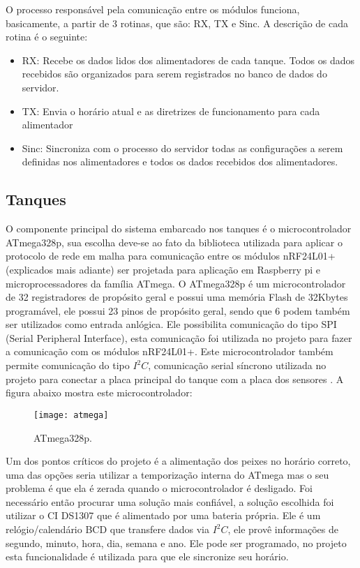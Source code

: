 O processo responsável pela comunicação entre os módulos funciona, basicamente, a partir de 3 rotinas, que são: RX, TX e Sinc. A descrição de cada rotina é o seguinte:

    \begin{itemize}
\item{RX: Recebe os dados lidos dos alimentadores de cada tanque. Todos os dados recebidos são organizados para serem registrados no banco de dados do servidor.}
\item{TX: Envia o horário atual e as diretrizes de funcionamento para cada alimentador}
\item{Sinc: Sincroniza  com o processo do servidor todas as configurações a serem definidas nos alimentadores e todos os dados recebidos dos alimentadores.}
\end{itemize}


\subsection{Tanques}

O componente principal do sistema embarcado nos tanques é o microcontrolador ATmega328p, sua escolha deve-se ao fato da biblioteca utilizada para aplicar o protocolo de rede em malha para comunicação entre os módulos nRF24L01+ (explicados mais adiante) ser projetada para aplicação em Raspberry pi e microprocessadores da família ATmega.
O ATmega328p é um microcontrolador de 32 registradores de propósito geral e possui uma memória Flash de 32Kbytes programável, ele possui 23 pinos de propósito geral, sendo que 6 podem também ser utilizados como entrada anlógica. Ele possibilita comunicação do tipo SPI (Serial Peripheral Interface), esta comunicação foi utilizada no projeto para fazer a comunicação com os módulos nRF24L01+. Este microcontrolador também permite comunicação do tipo $I^{2}C$, comunicação serial síncrono utilizada no projeto para conectar a placa principal do tanque com a placa dos sensores \cite{atmel:atmega328p}. A figura abaixo mostra este microcontrolador:

\begin{figure}[!h]
\centering \texttt{[image: atmega]}
\caption{ATmega328p.}
\label{atmega}
 \end{figure}

 Um dos pontos críticos do projeto é a alimentação dos peixes no horário correto, uma das opções seria utilizar a temporização interna do ATmega mas o seu problema é que ela é zerada quando o microcontrolador é desligado. Foi necessário então procurar uma solução mais confiável, a solução escolhida foi utilizar o CI DS1307 que é alimentado por uma bateria própria. Ele é um relógio/calendário BCD que transfere dados via $I^{2}C$, ele provê informações de segundo, minuto, hora, dia, semana e ano. Ele pode ser programado, no projeto esta funcionalidade é utilizada para que ele sincronize seu horário.

